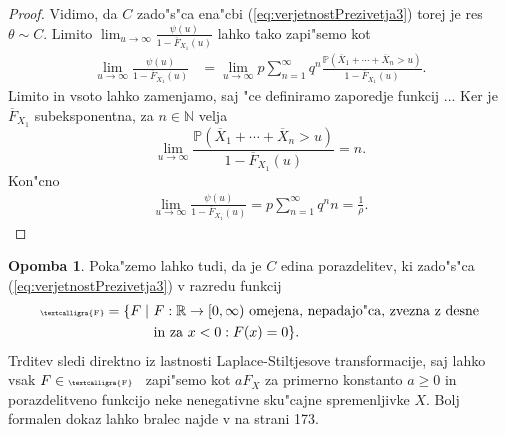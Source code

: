 \documentclass[12pt, a4paper, reqno]{amsart}
\theoremstyle{definition}
\newtheorem{opomba}[definicija]{Opomba}
\theoremstyle{plain}
\newcommand{\R}{\mathbb{R}}
\newcommand{\N}{\mathbb{N}}
\newcommand{\Prob}{\mathbb{P}}
\newcommand{\1}{\mathds{1}}
\begin{document}
\begin{proof}
            Vidimo, da $C$ zado"s"ca ena"cbi (\ref{eq:verjetnostPrezivetja3}) torej je res $\theta\sim C$. Limito 
            $\lim_{u\to\infty}\frac{\psi(u)}{1 - \overline{F}_{X_1}(u)}$ lahko tako zapi"semo kot
            \begin{align*}
                \lim_{u\to\infty}\frac{\psi(u)}{1 - \overline{F}_{X_1}(u)}   &= \lim_{u\to\infty}p\sum_{n=1}^{\infty}q^n\frac{\Prob\left(\overline{X}_1 + \cdots +\overline{X}_n > u\right)}{1 - \overline{F}_{X_1}(u)}.
            \end{align*}
            Limito in vsoto lahko zamenjamo, saj "ce definiramo zaporedje funkcij ...
            Ker je $\overline{F}_{X_1}$ subeksponentna, za $n\in\N$ velja
            \begin{equation*}
                \lim_{u\to\infty}\frac{\Prob\left(\overline{X}_1 + \cdots +\overline{X}_n > u\right)}{1 - \overline{F}_{X_1}(u)} = n.
            \end{equation*}
            Kon"cno 
            \begin{align*}
                \lim_{u\to\infty}\frac{\psi(u)}{1 - \overline{F}_{X_1}(u)} = p\sum_{n=1}^\infty q^nn = \frac{1}{\rho}.
            \end{align*}
        \end{proof}

        \begin{opomba}
            Poka"zemo lahko tudi, da je $C$ edina porazdelitev, ki zado"s"ca (\ref{eq:verjetnostPrezivetja3})
            v razredu funkcij 
            \begin{align*}
                \text{\tiny\textcalligra{F}} = \{F \mid \ & \text{$F:\R\to[0, \infty)$ omejena, nepadajo"ca, zvezna z desne} \\
                & \text{in za $x<0:F(x)=0$}\}.
            \end{align*}
            Trditev sledi direktno iz lastnosti Laplace-Stiltjesove transformacije, saj lahko vsak $F\in
            \text{\tiny\textcalligra{F}}$ \ zapi"semo kot $aF_X$ za primerno konstanto $a\geq0$ in porazdelitveno 
            funkcijo neke nenegativne sku"cajne spremenljivke $X$. Bolj formalen dokaz lahko bralec najde 
            v \cite{4} na strani 173.
            \label{op:tezkorepnePorazdelitveAsimptotika}
        \end{opomba}
\end{document}
